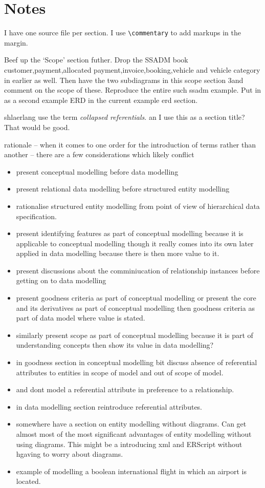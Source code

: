 
\section*{Notes}
\mynote I  have one source file per section.
\mynote I  use \verb'\commentary' to add markups in the margin.

\mynote Beef up the `Scope' section futher. 
Drop the SSADM book customer,payment,allocated payment,invoice,booking,vehicle and vehicle category in earlier as well. Then have the two subdiagrams in this scope section 3and comment on the scope of these.
Reproduce the entire such ssadm example. Put in as a second example ERD in the current example erd section.
\begin{noteforfuture}
shlaerlang use the term \textit{collapsed referentials}.
an I use this as a section title? That would be good.
\end{noteforfuture}

\mynote rationale -- when it comes to one order for the introduction of terms rather than another -- there are a few considerations which likely conflict
\begin{itemize}
	\item  present conceptual modelling before data modelling
	\item  present relational data modelling before structured entity modelling
	\item rationalise structured entity modelling from point of view of hierarchical data specification. 
	\item  present identifying features as part of conceptual modelling because
	it is applicable to conceptual modelling though it really comes into its own
	later applied in data modelling
	because there is then more value to it.
	\item present discussions about the comminiucation of relationship instances before 
		getting on to data modelling
	\item   present goodness criteria as part of conceptual modelling
	or present the core and its derivatives as part of conceptual modelling then goodness criteria as part of data model where value is stated.
	\item similarly present scope as part of conceptual modelling because it is part of understanding concepts then show its value in data modelling? 
	\item in goodness section in conceptual modelling bit discuss absence of referential attributes to entities in scope of model and out of scope of model.
	\item and dont model a referential attribute in preference to a relationship.
	\item in data modelling section reintroduce referential attributes. 
	\item somewhere have a section on entity modelling without diagrams. Can get almost most of the most significant advantages of entity modelling without using diagrams. This might be a  introducing xml and ERScript without hgaving to worry about diagrams.
	\item example of modelling a boolean international flight in which an airport is located.
\end{itemize}

